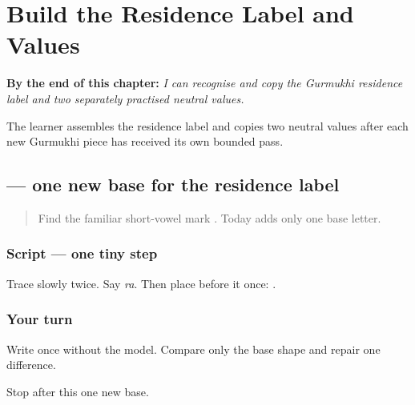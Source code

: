 
\chapter{Build the Residence Label and Values}
\label{ch:pa-form-residence-runway}

\begin{chapteropening}
\textbf{By the end of this chapter:} \emph{I can recognise and copy the Gurmukhi residence label and two separately practised neutral values.}

The learner assembles the residence label and copies two neutral values after each new Gurmukhi piece has received its own bounded pass.
\end{chapteropening}

\section[\texorpdfstring{\pa{ਰ} (ra)}{ਰ (ra)}]{ — one new base for the residence label}

\label{lesson:PA-W04-ra}



\begin{quote}
Find the familiar short-vowel mark \textbf{}. Today adds only one base letter.
\end{quote}

\subsection*{Script — one tiny step}

Trace \textbf{} slowly twice. Say \emph{ra}. Then place \textbf{} before it once: \textbf{}.

\subsection*{Your turn}
Write \textbf{} once without the model. Compare only the base shape and repair one difference.

\begin{tcolorbox}[breakable,colback=teal!4,colframe=teal!35!black,title={Before you move on}]
Stop after this one new base.
\end{tcolorbox}
